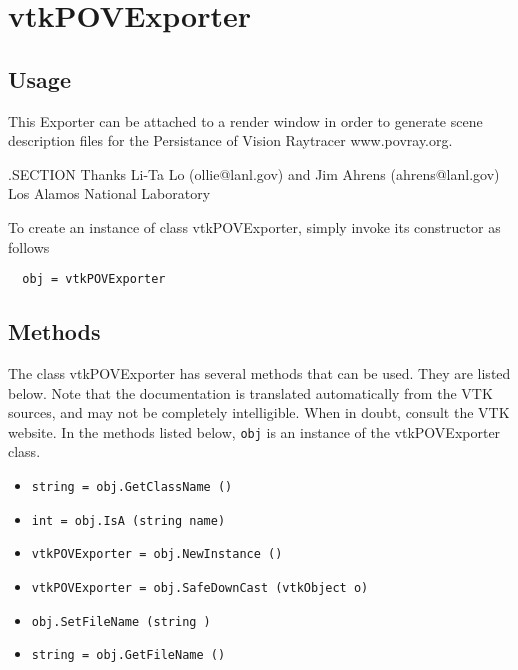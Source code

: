 \section{vtkPOVExporter}

\subsection{Usage}

 This Exporter can be attached to a render window in order to generate 
 scene description files for the Persistance of Vision Raytracer
 www.povray.org.

 .SECTION Thanks
 Li-Ta Lo (ollie@lanl.gov) and Jim Ahrens (ahrens@lanl.gov)
 Los Alamos National Laboratory

To create an instance of class vtkPOVExporter, simply
invoke its constructor as follows
\begin{verbatim}
  obj = vtkPOVExporter
\end{verbatim}
\subsection{Methods}

The class vtkPOVExporter has several methods that can be used.
  They are listed below.
Note that the documentation is translated automatically from the VTK sources,
and may not be completely intelligible.  When in doubt, consult the VTK website.
In the methods listed below, \verb|obj| is an instance of the vtkPOVExporter class.
\begin{itemize}
\item  \verb|string = obj.GetClassName ()|

\item  \verb|int = obj.IsA (string name)|

\item  \verb|vtkPOVExporter = obj.NewInstance ()|

\item  \verb|vtkPOVExporter = obj.SafeDownCast (vtkObject o)|

\item  \verb|obj.SetFileName (string )|

\item  \verb|string = obj.GetFileName ()|

\end{itemize}
